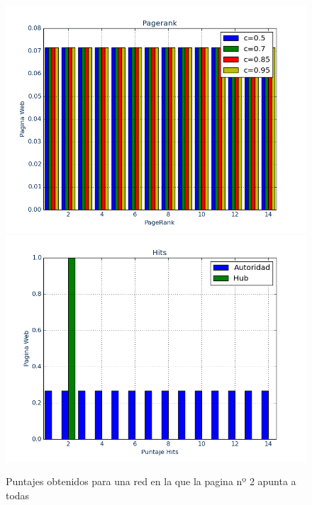 \documentclass[a4paper]{article}
\begin{document}
\begin{figure}[htbp]
\centering
\includegraphics[scale=0.385]{img/eldosatodos.png}
\includegraphics[scale=0.385]{img/eldosatodosH.png}
\caption{Puntajes obtenidos para una red en la que la pagina nº 2 apunta a todas}
\end{figure}
\end{document}
